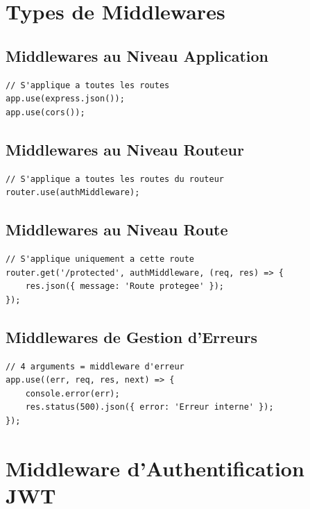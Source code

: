 \documentclass[a4paper,12pt]{book}
\begin{document}
\section{Types de Middlewares}

\subsection{Middlewares au Niveau Application}

\begin{lstlisting}[style=javascript]
// S'applique a toutes les routes
app.use(express.json());
app.use(cors());
\end{lstlisting}

\subsection{Middlewares au Niveau Routeur}

\begin{lstlisting}[style=javascript]
// S'applique a toutes les routes du routeur
router.use(authMiddleware);
\end{lstlisting}

\subsection{Middlewares au Niveau Route}

\begin{lstlisting}[style=javascript]
// S'applique uniquement a cette route
router.get('/protected', authMiddleware, (req, res) => {
    res.json({ message: 'Route protegee' });
});
\end{lstlisting}

\subsection{Middlewares de Gestion d'Erreurs}

\begin{lstlisting}[style=javascript]
// 4 arguments = middleware d'erreur
app.use((err, req, res, next) => {
    console.error(err);
    res.status(500).json({ error: 'Erreur interne' });
});
\end{lstlisting}

\section{Middleware d'Authentification JWT}
\end{document}
